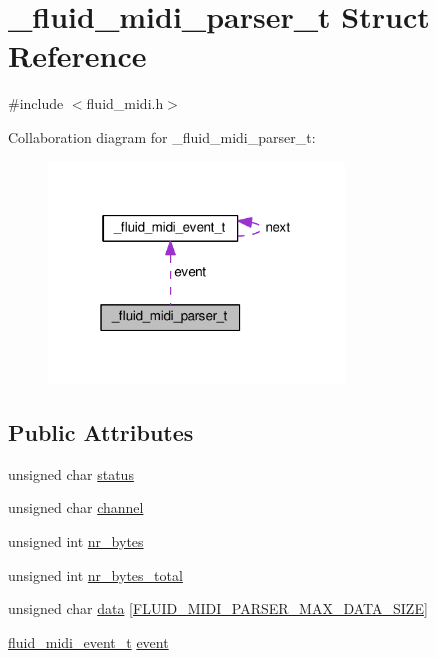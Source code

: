 \hypertarget{struct__fluid__midi__parser__t}{}\section{\+\_\+fluid\+\_\+midi\+\_\+parser\+\_\+t Struct Reference}
\label{struct__fluid__midi__parser__t}


{\ttfamily \#include $<$fluid\+\_\+midi.\+h$>$}



Collaboration diagram for \+\_\+fluid\+\_\+midi\+\_\+parser\+\_\+t\+:
\nopagebreak
\begin{figure}[H]
\begin{center}
\leavevmode
\includegraphics[width=223pt]{struct__fluid__midi__parser__t__coll__graph}
\end{center}
\end{figure}
\subsection*{Public Attributes}
\begin{DoxyCompactItemize}
\item 
unsigned char \hyperlink{struct__fluid__midi__parser__t_a32006b8e0b4a5acc3781753e682f70d3}{status}
\item 
unsigned char \hyperlink{struct__fluid__midi__parser__t_adc9286927514faff96288f3458c898cf}{channel}
\item 
unsigned int \hyperlink{struct__fluid__midi__parser__t_ad0106e994167162f1554186d345ae222}{nr\+\_\+bytes}
\item 
unsigned int \hyperlink{struct__fluid__midi__parser__t_a5cb62ed4894d4d2926150b9f9434e477}{nr\+\_\+bytes\+\_\+total}
\item 
unsigned char \hyperlink{struct__fluid__midi__parser__t_a4addc15eb062d2ab41a772fced380212}{data} \mbox{[}\hyperlink{fluid__midi_8h_ab689c6733a42a3c985378354f29fb571}{F\+L\+U\+I\+D\+\_\+\+M\+I\+D\+I\+\_\+\+P\+A\+R\+S\+E\+R\+\_\+\+M\+A\+X\+\_\+\+D\+A\+T\+A\+\_\+\+S\+I\+ZE}\mbox{]}
\item 
\hyperlink{types_8h_a61c72b76e3ee344637994c3071f74d94}{fluid\+\_\+midi\+\_\+event\+\_\+t} \hyperlink{struct__fluid__midi__parser__t_a0ba50c10a405a0fb3c5125e154d2ba34}{event}
\end{DoxyCompactItemize}


